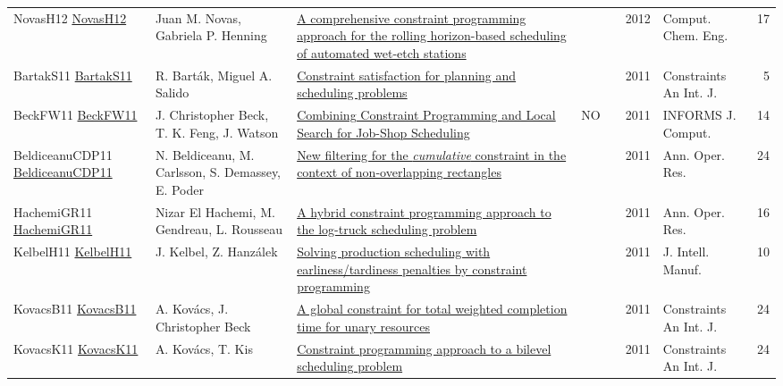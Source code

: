 {\begin{longtable}{p{3cm}p{6cm}p{7cm}rrrp{3cm}r}
NovasH12 \href{https://doi.org/10.1016/j.compchemeng.2012.01.005}{NovasH12} & Juan M. Novas, Gabriela P. Henning & \href{articles/NovasH12.pdf}{A comprehensive constraint programming approach for the rolling horizon-based scheduling of automated wet-etch stations} &  & \cite{NovasH12} & 2012 & Comput. Chem. Eng. & 17\\
BartakS11 \href{https://doi.org/10.1007/s10601-011-9109-4}{BartakS11} & R. Bart{\'{a}}k, Miguel A. Salido & \href{articles/BartakS11.pdf}{Constraint satisfaction for planning and scheduling problems} &  & \cite{BartakS11} & 2011 & Constraints An Int. J. & 5\\
BeckFW11 \href{https://doi.org/10.1287/ijoc.1100.0388}{BeckFW11} & J. Christopher Beck, T. K. Feng, J. Watson & \href{articles/BeckFW11.pdf}{Combining Constraint Programming and Local Search for Job-Shop Scheduling} & NO & \cite{BeckFW11} & 2011 & {INFORMS} J. Comput. & 14\\
BeldiceanuCDP11 \href{https://doi.org/10.1007/s10479-010-0731-0}{BeldiceanuCDP11} & N. Beldiceanu, M. Carlsson, S. Demassey, E. Poder & \href{articles/BeldiceanuCDP11.pdf}{New filtering for the \emph{cumulative} constraint in the context of non-overlapping rectangles} &  & \cite{BeldiceanuCDP11} & 2011 & Ann. Oper. Res. & 24\\
HachemiGR11 \href{https://doi.org/10.1007/s10479-010-0698-x}{HachemiGR11} & Nizar El Hachemi, M. Gendreau, L. Rousseau & \href{articles/HachemiGR11.pdf}{A hybrid constraint programming approach to the log-truck scheduling problem} &  & \cite{HachemiGR11} & 2011 & Ann. Oper. Res. & 16\\
KelbelH11 \href{https://doi.org/10.1007/s10845-009-0318-2}{KelbelH11} & J. Kelbel, Z. Hanz{\'{a}}lek & \href{articles/KelbelH11.pdf}{Solving production scheduling with earliness/tardiness penalties by constraint programming} &  & \cite{KelbelH11} & 2011 & J. Intell. Manuf. & 10\\
KovacsB11 \href{https://doi.org/10.1007/s10601-009-9088-x}{KovacsB11} & A. Kov{\'{a}}cs, J. Christopher Beck & \href{articles/KovacsB11.pdf}{A global constraint for total weighted completion time for unary resources} &  & \cite{KovacsB11} & 2011 & Constraints An Int. J. & 24\\
KovacsK11 \href{https://doi.org/10.1007/s10601-010-9102-3}{KovacsK11} & A. Kov{\'{a}}cs, T. Kis & \href{articles/KovacsK11.pdf}{Constraint programming approach to a bilevel scheduling problem} &  & \cite{KovacsK11} & 2011 & Constraints An Int. J. & 24\\

\end{longtable}}
